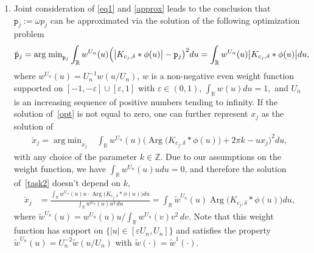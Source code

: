 \documentclass[numbers,webpdf,imaiai]{ima-authoring-template}%
\theoremstyle{thmstyletwo}%
\newcommand{\Z}{\mathbb{Z}}
\newcommand{\R}{\mathbb{R}}
\newcommand{\F}{\mathcal{F}}
\renewcommand{\i}{\mathrm{i}}
\newcommand{\p}{\mathtt{p}}
\newcommand{\w}{\omega}
\newcommand{\eps}{\varepsilon}
\newcommand{\argmin}{\operatorname{arg\;min}}
\newcommand{\Arg}{\operatorname{Arg}}
\numberwithin{equation}{section}
\begin{document}
\begin{enumerate}
\item Joint consideration of \eqref{eq1} and \eqref{approx} leads to the conclusion that \(\p_j := \w p_j\)  can be approximated via the solution of the following optimization problem 
\begin{align}\label{opt}\breve{\p}_j &=\argmin_{\p_j} \int_{\R} w^{U_n} (u) 
\Bigl( \bigl| 
      K_{c_j,\delta} * \phi(u) \bigr| -  \p_j  \bigr)^2 du =      \int_{\R} w^{U_n} (u) \bigl| 
      K_{c_j,\delta} * \phi(u) \bigr| du,
\end{align} 
where  $w^{U_n}(u) = U_n^{-1}w(u/U_n)$, \(w\) is a non-negative even weight function supported on \([-1, -\eps] \cup [\eps,1]\) with \(\eps \in (0,1)\), \(\int_\R w(u) du=1,\) and  \(U_n\) is an increasing sequence of positive numbers tending to infinity. If  the solution of~\eqref{opt} is not equal to zero, one can further represent \(x_j\) as the solution of 
\begin{align}\label{task2}
\breve{x}_j=\argmin_{x_j} &\int_{\R} w^{U_n} (u) \bigl( \Arg \bigl(      K_{c_j,\delta} * \phi(u) \bigr) +  2\pi k -u x_j  \bigr)^2 du,
\end{align} 
with any choice of the parameter \(k \in \Z\). Due to our assumptions on the weight function, we have \(\int_\R w^{U_n}(u) u du=0\), and therefore the solution of~\eqref{task2} doesn't depend on \(k\),\begin{align} \label{task3}
\breve{x}_j &=
\frac{\int_{\R} w^{U_n} (u) u \cdot
\Arg \bigl(      K_{c_j,\delta} * \phi (u) \bigr)
 du}{ \int_{\R} w^{U_n} (u) u^2 \, du} =\int_{\R} \widetilde{w}^{U_n} (u) \Arg\bigl( 
      K_{c_j,\delta} * \phi(u) \bigr) du,
 \end{align}
where \(\widetilde{w}^{U_n}(u) = w^{U_n} (u) u /\int_{\R} w^{U_n} (v) v^2 \, dv.\) Note that  this weight function has support on \(\{|u| \in [\eps U_n, U_n]\}\) and satisfies the property \( \widetilde{w}^{U_n}(u)=U_n^{-2}\widetilde{w}(u/U_n)  \) with  \(\widetilde{w}(\cdot)=\widetilde{w}^1(\cdot).\) 

\end{enumerate}
\end{document}
